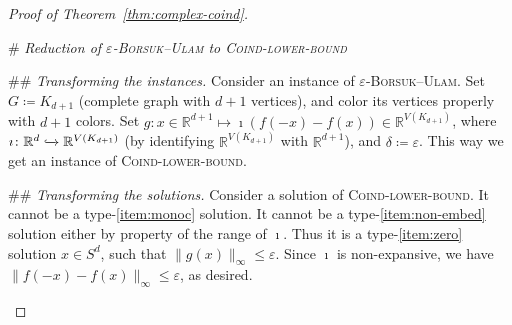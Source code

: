 \documentclass[12pt]{amsart}
\theoremstyle{definition}
\def\R{\mathbb{R}}
\renewcommand{\leq}{\leqslant}
\begin{document}
\begin{proof}[Proof of Theorem~\ref{thm:complex-coind}]
\begin{easylist}
# {\em Reduction of \textsc{$\varepsilon$-Borsuk--Ulam} to \textsc{Coind-lower-bound}}

## {\em Transforming the instances.} Consider an instance of \textsc{$\varepsilon$-Borsuk--Ulam}. Set $G \coloneqq K_{d+1}$ (complete graph with $d+1$ vertices), and color its vertices properly with $d+1$ colors. Set $g\colon x\in\R^{d+1} \mapsto \imath(f(-x) - f(x)) \in \R^{V(K_{d+1})}$, where $\imath\colon\R^d \xhookrightarrow{}\R^{V(K_{d+1})}$ (by identifying $\R^{V(K_{d+1})}$ with $\R^{d+1}$), and $\delta  \coloneqq \varepsilon$. This way we get an instance of \textsc{Coind-lower-bound}.

## {\em Transforming the solutions.} Consider a solution of \textsc{Coind-lower-bound}. It cannot be a type-\eqref{item:monoc} solution. It cannot be a type-\eqref{item:non-embed} solution either by property of the range of $\imath$. Thus it is a type-\eqref{item:zero} solution $x\in S^d$, such that $\|g(x)\|_{\infty}\leq \varepsilon$. Since $\imath$ is non-expansive, we have $\|f(-x)-f(x)\|_{\infty}\leq \varepsilon$, as desired.\qedhere
\end{easylist}
\end{proof}
\end{document}

